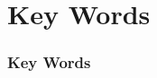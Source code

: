 \section{Key Words}


\begin{frame}
\frametitle{Key Words}
\printglossary[type=\acronymtype]
\end{frame}